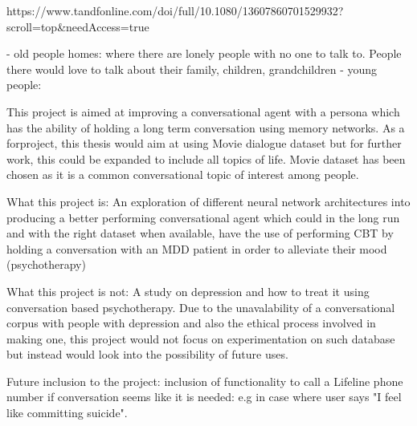 https://www.tandfonline.com/doi/full/10.1080/13607860701529932?scroll=top&needAccess=true

- old people homes: where there are lonely people with no one to talk to. People there would love to talk about their family, children, grandchildren
- young people: 

This project is aimed at improving a conversational agent with a persona which has the ability of holding a long term conversation using memory networks. As a forproject, this thesis would aim at using Movie dialogue dataset but for further work, this could be expanded to include all topics of life.
Movie dataset has been chosen as it is a common conversational topic of interest among people.

What this project is:
An exploration of different neural network architectures into producing a better performing conversational agent which could in the long run and with the right dataset when available, have the use of performing CBT by holding a conversation with an MDD patient in order to alleviate their mood (psychotherapy)

What this project is not:
A study on depression and how to treat it using conversation based psychotherapy.
Due to the unavalability of a conversational corpus with people with depression and also the ethical process involved in making one, this project would not focus on experimentation on such database but instead would look into the possibility of future uses.


Future inclusion to the project:
inclusion of functionality to call a Lifeline phone number if conversation seems like it is needed: e.g in case where user says "I feel like committing suicide".




